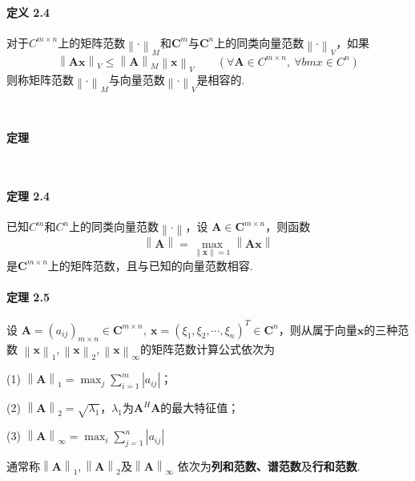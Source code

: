 \documentclass[12pt, a4paper, oneside, fontset=none]{ctexart}
\begin{document}
\paragraph*{定义 2.4} 对于$C^{m\times n}$上的矩阵范数$\left\lVert \bm{\cdot} \right\rVert _M$和$\bm{C}^m$与$\bm{C}^n$上的同类向量范数$\left\lVert \bm{\cdot} \right\rVert _V$，如果
\[
    \left\lVert \bm{Ax} \right\rVert _V \leqslant \left\lVert \bm{A} \right\rVert _M \left\lVert \bm{x} \right\rVert _V \qquad (\forall \bm{A} \in C^{m\times n},\ \forall bm{x} \in C^n)
\]
则称矩阵范数$\left\lVert \bm{\cdot} \right\rVert _M$与向量范数$\left\lVert \bm{\cdot} \right\rVert _V$是相容的.

\par \ \par

\centerline{\large{\textbf{定理}}} \ \par

\paragraph*{定理 2.4} 已知$C^m$和$C^n$上的同类向量范数$\left\lVert \bm{\cdot} \right\rVert$，设 $\bm{A} \in \bm{C}^{m\times n}$，则函数
\[
    \left\lVert \bm{A} \right\rVert = \max_{\left\lVert \bm{x} \right\rVert = 1} \left\lVert \bm{Ax} \right\rVert
\]
是$\bm{C}^{m\times n}$上的矩阵范数，且与已知的向量范数相容.

\paragraph*{定理 2.5} 设 $\bm{A} = (a_{ij})_{m\times n} \in \bm{C}^{m\times n},\ \bm{x} = (\xi_1,\xi_2,\cdots,\xi_n)^T \in \bm{C}^n$，则从属于向量$\bm{x}$的三种范数
$\left\lVert \bm{x} \right\rVert _1, \left\lVert \bm{x} \right\rVert _2, \left\lVert \bm{x} \right\rVert _\infty$的矩阵范数计算公式依次为 \par
(1) $\left\lVert \bm{A} \right\rVert _1 = \max_j \sum_{i=1}^m \left\lvert a_{ij} \right\rvert $； \par
(2) $\left\lVert \bm{A} \right\rVert _2 = \sqrt{\lambda_1}$，$\lambda_1$为$\bm{A}^H\bm{A}$的最大特征值；\par
(3) $\left\lVert \bm{A} \right\rVert _\infty = \max_i \sum_{j=1}^n \left\lvert a_{ij} \right\rvert $ \par
通常称$\left\lVert \bm{A} \right\rVert _1, \left\lVert \bm{A} \right\rVert _2$及$\left\lVert \bm{A} \right\rVert _\infty$ 依次为\textbf{列和范数、谱范数}及\textbf{行和范数}.
\end{document}
